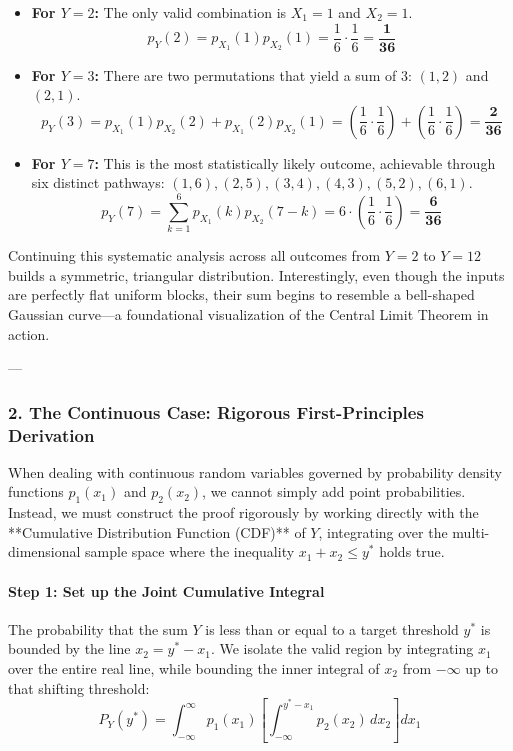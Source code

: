 \documentclass{article}
\begin{document}
\begin{itemize}
    \item \textbf{For $Y = 2$:} The only valid combination is $X_1 = 1$ and $X_2 = 1$.
    \begin{equation*}
    p_Y(2) = p_{X_1}(1)p_{X_2}(1) = \frac{1}{6} \cdot \frac{1}{6} = \mathbf{\frac{1}{36}}
    \end{equation*}
    \item \textbf{For $Y = 3$:} There are two permutations that yield a sum of 3: $(1,2)$ and $(2,1)$.
    \begin{equation*}
    p_Y(3) = p_{X_1}(1)p_{X_2}(2) + p_{X_1}(2)p_{X_2}(1) = \left(\frac{1}{6} \cdot \frac{1}{6}\right) + \left(\frac{1}{6} \cdot \frac{1}{6}\right) = \mathbf{\frac{2}{36}}
    \end{equation*}
    \item \textbf{For $Y = 7$:} This is the most statistically likely outcome, achievable through six distinct pathways: $(1,6), (2,5), (3,4), (4,3), (5,2), (6,1)$.
    \begin{equation*}
    p_Y(7) = \sum_{k=1}^{6} p_{X_1}(k)p_{X_2}(7-k) = 6 \cdot \left(\frac{1}{6} \cdot \frac{1}{6}\right) = \mathbf{\frac{6}{36}}
    \end{equation*}
\end{itemize}

Continuing this systematic analysis across all outcomes from $Y=2$ to $Y=12$ builds a symmetric, triangular distribution. Interestingly, even though the inputs are perfectly flat uniform blocks, their sum begins to resemble a bell-shaped Gaussian curve—a foundational visualization of the Central Limit Theorem in action.

---

\subsubsection*{2. The Continuous Case: Rigorous First-Principles Derivation}

When dealing with continuous random variables governed by probability density functions $p_1(x_1)$ and $p_2(x_2)$, we cannot simply add point probabilities. Instead, we must construct the proof rigorously by working directly with the **Cumulative Distribution Function (CDF)** of $Y$, integrating over the multi-dimensional sample space where the inequality $x_1 + x_2 \le y^*$ holds true.

\paragraph{Step 1: Set up the Joint Cumulative Integral}
The probability that the sum $Y$ is less than or equal to a target threshold $y^*$ is bounded by the line $x_2 = y^* - x_1$. We isolate the valid region by integrating $x_1$ over the entire real line, while bounding the inner integral of $x_2$ from $-\infty$ up to that shifting threshold:
\begin{equation}
P_Y(y^*) = \int_{-\infty}^{\infty} p_1(x_1) \left[ \int_{-\infty}^{y^* - x_1} p_2(x_2) \, dx_2 \right] dx_1 \tag{228}
\end{equation}
\end{document}
